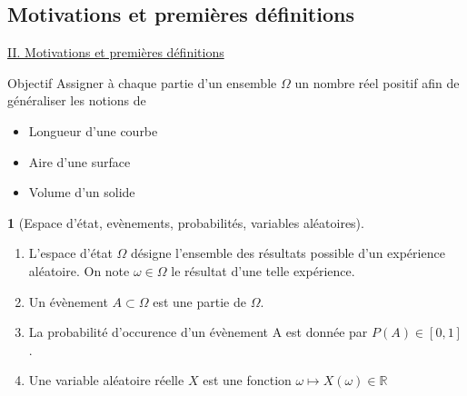 \documentclass[8pt,notheorems]{beamer}
\theoremstyle{definition}
\newtheorem{definition}{\translate{Definition}}
\theoremstyle{example}
\theoremstyle{mystyle}
\theoremstyle{plain}
\begin{document}
\begin{frame}
\section{Motivations et premières définitions}
\underline{II. Motivations et premières définitions}\\

\begin{block}{Objectif}
Assigner à chaque partie d'un ensemble $\Omega$ un nombre réel positif afin de généraliser les notions de
\begin{itemize}
\item Longueur d'une courbe
\item Aire d'une surface
\item Volume d'un solide
\end{itemize}
\end{block}
\begin{definition}[Espace d'état, evènements, probabilités, variables aléatoires]
\begin{enumerate}
\item L'espace d'état $\Omega$ désigne l'ensemble des résultats possible d'un expérience aléatoire. On note $\omega\in\Omega$ le résultat d'une telle expérience.
\item Un évènement $A\subset\Omega$ est une partie de $\Omega$.
\item La probabilité d'occurence d'un évènement A est donnée par $P(A)\in[0,1]$.
\item Une variable aléatoire réelle $X$ est une fonction $\omega\mapsto X(\omega)\in\mathbb{R}$
\end{enumerate}
\end{definition}
\end{frame}
\end{document}
